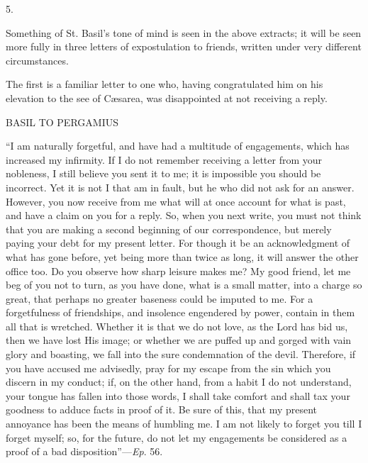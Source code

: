 5.

Something of St. Basil's tone of mind is seen in the above
extracts; it will be seen more fully in three letters of expostulation
to friends, written under very different circumstances.

The first is a familiar letter to one who, having congratulated him
on his elevation to the see of Cæsarea, was disappointed at not
receiving a reply.

BASIL TO PERGAMIUS

``I am naturally forgetful, and have had a multitude of
engagements, which has increased my infirmity. If I do not remember
receiving a letter from your nobleness, I still believe you sent it to
me; it is impossible you should be incorrect. Yet it is not I that am
in fault, but he who did not ask for an answer. However, you now
receive from me what will at once account for what is past, and have a
claim on you for a reply. So, when you next write, you must not think
that you are making a second beginning of our correspondence, but
merely paying your debt for my present letter. For though it be an
acknowledgment of what has gone before, yet being more than twice as
long, it will answer the other office too. Do you observe how sharp
leisure makes me? My good friend, let me
beg of you not to turn, as you have done, what is a small matter, into
a charge so great, that perhaps no greater baseness could be imputed
to me. For a forgetfulness of friendships, and insolence engendered by
power, contain in them all that is wretched. Whether it is that we do
not love, as the Lord has bid us, then we have lost His image; or
whether we are puffed up and gorged with vain glory and boasting, we
fall into the sure condemnation of the devil. Therefore, if you have
accused me advisedly, pray for my escape from the sin which you
discern in my conduct; if, on the other hand, from a habit I do not
understand, your tongue has fallen into those words, I shall take
comfort and shall tax your goodness to adduce facts in proof of it. Be
sure of this, that my present annoyance has been the means of humbling
me. I am not likely to forget you till I forget myself; so, for the
future, do not let my engagements be considered as a proof of a bad
disposition''—\emph{Ep}. 56.

